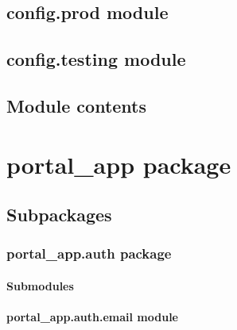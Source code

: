 \documentclass[letterpaper,10pt,english]{sphinxmanual}
\begin{document}
\subsection{config.prod module}
\label{\detokenize{config:module-config.prod}}\label{\detokenize{config:config-prod-module}}

\subsection{config.testing module}
\label{\detokenize{config:module-config.testing}}\label{\detokenize{config:config-testing-module}}

\subsection{Module contents}
\label{\detokenize{config:module-config}}\label{\detokenize{config:module-contents}}

\section{portal\_app package}
\label{\detokenize{CE_app:portal-app-package}}\label{\detokenize{CE_app::doc}}

\subsection{Subpackages}
\label{\detokenize{CE_app:subpackages}}

\subsubsection{portal\_app.auth package}
\label{\detokenize{CE_app.auth:portal-app-auth-package}}\label{\detokenize{CE_app.auth::doc}}

\paragraph{Submodules}
\label{\detokenize{CE_app.auth:submodules}}

\paragraph{portal\_app.auth.email module}
\label{\detokenize{CE_app.auth:module-CE_app.auth.email}}\label{\detokenize{CE_app.auth:portal-app-auth-email-module}}
\end{document}
